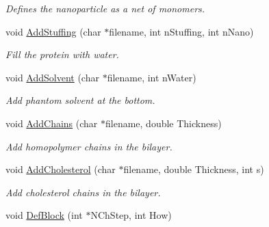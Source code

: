 \begin{DoxyCompactItemize}
\begin{DoxyCompactList}\small\item\em \-Defines the nanoparticle as a net of monomers. \end{DoxyCompactList}\item 
\hypertarget{classVarData_a50fbab23bda1928d73e1c560e3316520}{void \hyperlink{classVarData_a50fbab23bda1928d73e1c560e3316520}{\-Add\-Stuffing} (char $\ast$filename, int n\-Stuffing, int n\-Nano)}\label{classVarData_a50fbab23bda1928d73e1c560e3316520}

\begin{DoxyCompactList}\small\item\em \-Fill the protein with water. \end{DoxyCompactList}\item 
\hypertarget{classVarData_a13774b113731faa29ab68cebe64835e6}{void \hyperlink{classVarData_a13774b113731faa29ab68cebe64835e6}{\-Add\-Solvent} (char $\ast$filename, int n\-Water)}\label{classVarData_a13774b113731faa29ab68cebe64835e6}

\begin{DoxyCompactList}\small\item\em \-Add phantom solvent at the bottom. \end{DoxyCompactList}\item 
\hypertarget{classVarData_aa1cf6c8bbac3409cb22b55450bcf1aad}{void \hyperlink{classVarData_aa1cf6c8bbac3409cb22b55450bcf1aad}{\-Add\-Chains} (char $\ast$filename, double \-Thickness)}\label{classVarData_aa1cf6c8bbac3409cb22b55450bcf1aad}

\begin{DoxyCompactList}\small\item\em \-Add homopolymer chains in the bilayer. \end{DoxyCompactList}\item 
\hypertarget{classVarData_a16aa5c5de066f24fa1f598d2a460f353}{void \hyperlink{classVarData_a16aa5c5de066f24fa1f598d2a460f353}{\-Add\-Cholesterol} (char $\ast$filename, double \-Thickness, int s)}\label{classVarData_a16aa5c5de066f24fa1f598d2a460f353}

\begin{DoxyCompactList}\small\item\em \-Add cholesterol chains in the bilayer. \end{DoxyCompactList}\item 
\hypertarget{classVarData_a80a5e498e47cbb396e01f85c0392a274}{void \hyperlink{classVarData_a80a5e498e47cbb396e01f85c0392a274}{\-Def\-Block} (int $\ast$\-N\-Ch\-Step, int \-How)}\label{classVarData_a80a5e498e47cbb396e01f85c0392a274}


\end{DoxyCompactItemize}

